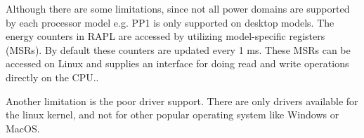 

Although there are some limitations, since not all power domains are supported by each processor model e.g. PP1 is only supported on desktop models. The energy counters in RAPL are accessed by utilizing model-specific registers (MSRs). By default these counters are updated every 1 ms. These MSRs can be accessed on Linux and supplies an interface for doing read and write operations directly on the CPU.\cite{linux_manual_msr}.\nytafsnit

Another limitation is the poor driver support. There are only drivers available for the linux kernel, and not for other popular operating system like Windows or MacOS.\cite{RAPL_in_action}  


